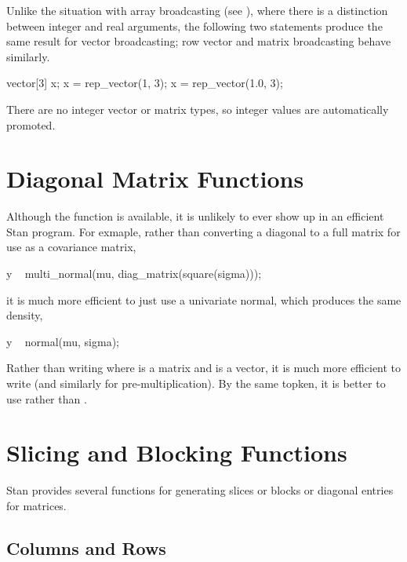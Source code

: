 Unlike the situation with array broadcasting (see ), where there is a
distinction between integer and real arguments, the following two
statements produce the same result for vector broadcasting;  row vector
and matrix broadcasting behave similarly.
%
\begin{stancode}
vector[3] x;
x = rep_vector(1, 3);
x = rep_vector(1.0, 3);  
\end{stancode}
%
There are no integer vector or matrix types, so integer values are
automatically promoted.


\section{Diagonal Matrix Functions}

\begin{description}
%
%
%
\end{description}

Although the  function is available, it is unlikely
to ever show up in an efficient Stan program.  For exmaple, rather
than converting a diagonal to a full matrix for use as a covariance
matrix,
%
\begin{stancode}
y ~ multi_normal(mu, diag_matrix(square(sigma)));
\end{stancode}
%
it is much more efficient to just use a univariate normal, which
produces the same density,
%
\begin{stancode}
y ~ normal(mu, sigma);
\end{stancode}
%

Rather than writing  where  is a
matrix and  is a vector, it is much more efficient to write
 (and similarly for pre-multiplication).
By the same topken, it is better to use 
rather than .


\section{Slicing and Blocking Functions}

Stan provides several functions for generating slices or blocks or
diagonal entries for matrices.

\subsection{Columns and Rows}


